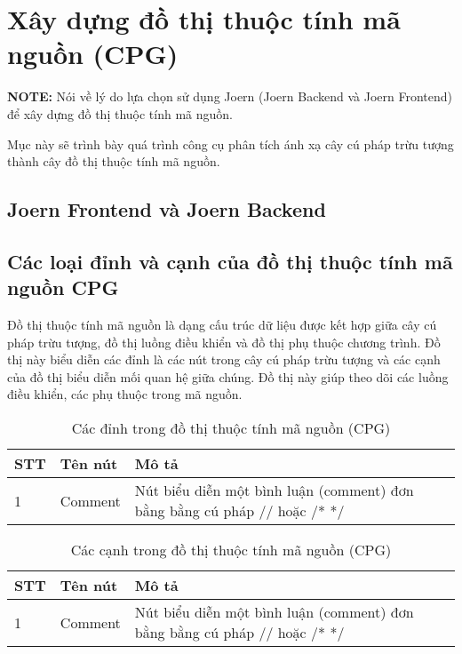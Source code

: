\section{Xây dựng đồ thị thuộc tính mã nguồn (CPG)}

\textbf{NOTE:} Nói về lý do lựa chọn sử dụng Joern (Joern Backend và Joern Frontend) để xây dựng đồ thị thuộc tính mã nguồn.

Mục này sẽ trình bày quá trình công cụ phân tích ánh xạ cây cú pháp trừu tượng
thành cây đồ thị thuộc tính mã nguồn.

\subsection{Joern Frontend và Joern Backend}

\subsection{Các loại đỉnh và cạnh của đồ thị thuộc tính mã nguồn CPG}

Đồ thị thuộc tính mã nguồn là dạng cấu trúc dữ liệu được kết hợp giữa cây cú pháp trừu tượng, đồ thị luồng điều khiển và đồ thị phụ thuộc chương trình. Đồ thị này biểu diễn các đỉnh là các nút trong cây cú pháp trừu tượng và các cạnh của đồ thị biểu diễn mối quan hệ giữa chúng. Đồ thị này giúp theo dõi các luồng điều khiển, các phụ thuộc trong mã nguồn.

\begin{table}[h]
\caption{Các đỉnh trong đồ thị thuộc tính mã nguồn (CPG)}
\label{table:nodecpgjoern}
  \begin{tabularx}{\textwidth}{|l|l|X|}
\hline
\textbf{STT} & \textbf{Tên nút} & \textbf{Mô tả} \\
\hline
1 & Comment & Nút biểu diễn một bình luận (comment) đơn bằng bằng cú pháp // hoặc /* */ \\
\hline
\end{tabularx}
\end{table}

\begin{table}[h]
\caption{Các cạnh trong đồ thị thuộc tính mã nguồn (CPG)}
\label{table:edgecpgjoern}
  \begin{tabularx}{\textwidth}{|l|l|X|}
\hline
\textbf{STT} & \textbf{Tên nút} & \textbf{Mô tả} \\
\hline
1 & Comment & Nút biểu diễn một bình luận (comment) đơn bằng bằng cú pháp // hoặc /* */ \\
\hline
\end{tabularx}
\end{table}

